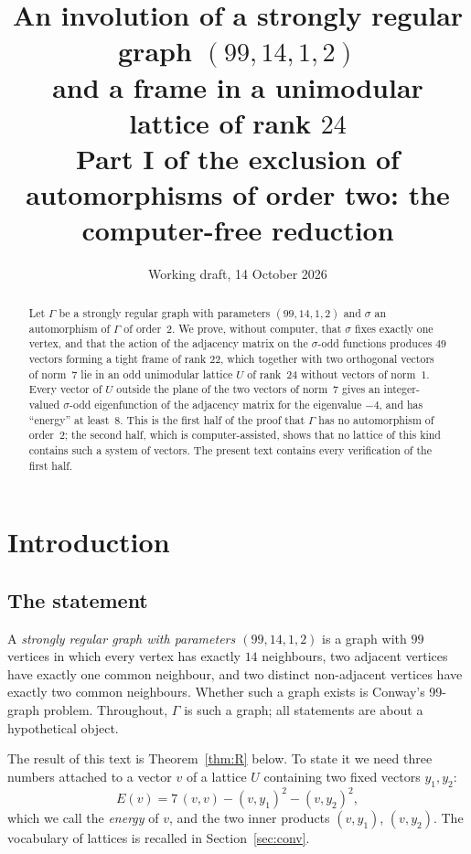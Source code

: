 \documentclass[11pt,a4paper]{article}
\title{An involution of a strongly regular graph $(99,14,1,2)$\\ and a frame in a unimodular lattice of rank $24$\\[4pt]
\large Part I of the exclusion of automorphisms of order two: the computer-free reduction}
\author{Working draft, 14 October 2026}
\date{}
\theoremstyle{definition}
\theoremstyle{remark}
\newcommand{\sg}{\sigma}
\begin{document}
\maketitle

\begin{abstract}
Let $\Gamma$ be a strongly regular graph with parameters $(99,14,1,2)$ and $\sg$ an automorphism of $\Gamma$ of
order~$2$. We prove, without computer, that $\sg$ fixes exactly one vertex, and that the action of the adjacency
matrix on the $\sg$-odd functions produces $49$ vectors forming a tight frame of rank $22$, which together with two
orthogonal vectors of norm~$7$ lie in an odd unimodular lattice $U$ of rank~$24$ without vectors of norm~$1$. Every
vector of $U$ outside the plane of the two vectors of norm~$7$ gives an integer-valued $\sg$-odd eigenfunction of the
adjacency matrix for the eigenvalue $-4$, and has ``energy'' at least~$8$. This is the first half of the proof that
$\Gamma$ has no automorphism of order~$2$; the second half, which is computer-assisted, shows that no lattice of this
kind contains such a system of vectors. The present text contains every verification of the first half.
\end{abstract}

\section{Introduction}

\subsection{The statement}
A \emph{strongly regular graph with parameters $(99,14,1,2)$} is a graph with $99$ vertices in which every vertex has
exactly $14$ neighbours, two adjacent vertices have exactly one common neighbour, and two distinct non-adjacent
vertices have exactly two common neighbours. Whether such a graph exists is Conway's 99-graph problem. Throughout,
$\Gamma$ is such a graph; all statements are about a hypothetical object.

The result of this text is Theorem~\ref{thm:R} below. To state it we need three numbers attached to a vector $v$ of a
lattice $U$ containing two fixed vectors $y_1,y_2$:
\[
E(v)=7\,(v,v)-(v,y_1)^2-(v,y_2)^2 ,
\]
which we call the \emph{energy} of $v$, and the two inner products $(v,y_1)$, $(v,y_2)$. The vocabulary of lattices is
recalled in Section~\ref{sec:conv}.
\end{document}
